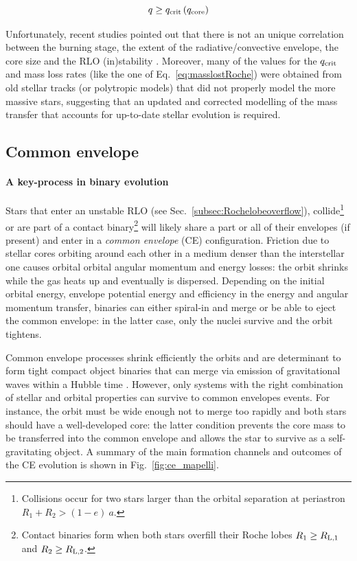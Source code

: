 \documentclass[a4paper,titlepage]{book}     	%
\newcommand{\rlone}{\ensuremath{R_\textup{L,1}}}
\newcommand{\rltwo}{\ensuremath{R_\textup{L,2}}}
\begin{document}
\begin{equation}\label{eq:qcrit}
	q \geq q_\textup{crit} \left(q_\textup{core}\right)
\end{equation}

Unfortunately, recent studies pointed out that there is not an unique correlation between the burning stage, the extent of the radiative/convective envelope, the core size and the RLO (in)stability \cite{klencki2020_mtproblems}. Moreover, many of the values for the $q_{\rm crit}$ and mass loss rates (like the one of Eq.\ \ref{eq:masslostRoche}) were obtained from old stellar tracks (or polytropic models) that did not properly model the more massive stars, suggesting that an updated and corrected modelling of the mass transfer that accounts for up-to-date stellar evolution is required.



\subsection{Common envelope}\label{subsec:Commonenvelope}
\paragraph{A key-process in binary evolution} Stars that enter an unstable RLO (see Sec.\ \ref{subsec:Rochelobeoverflow}), collide\footnote{Collisions occur for two stars larger than the orbital separation at periastron $R_1 + R_2 > (1-e)~a$.} or are part of a contact binary\footnote{Contact binaries form when both stars overfill their Roche lobes $R_1 \geq \rlone$ and $R_2 \geq \rltwo$.} will likely share a part or all of their envelopes (if present) and enter in a \emph{common envelope} (CE) configuration. Friction due to stellar cores orbiting around each other in a medium denser than the interstellar one causes orbital orbital angular momentum and energy losses: the orbit shrinks while the gas heats up and eventually is dispersed.  Depending on the initial orbital energy, envelope potential energy and efficiency in the energy and angular momentum transfer, binaries can either spiral-in and merge or be able to eject the common envelope: in the latter case, only the nuclei survive and the orbit tightens.

Common envelope processes shrink efficiently the orbits and are determinant to form tight compact object binaries that can merge via emission of gravitational waves within a Hubble time \cite{spera2019_mergingBBH}. However, only systems with the right combination of stellar and orbital properties can survive to common envelopes events. For instance, the orbit must be wide enough not to merge too rapidly and both stars should have a well-developed core: the latter condition prevents the core mass to be transferred into the common envelope and allows the star to survive as a self-gravitating object. A summary of the main formation channels and outcomes of the CE evolution is shown in Fig.\ \ref{fig:ce_mapelli}.
\end{document}
